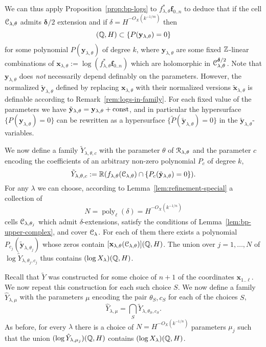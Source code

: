\documentclass[reqno]{amsart}
\renewcommand\~[1]{\widetilde{#1}}
\def\poly{\operatorname{poly}} \def\J{\operatorname{J}}
\def\vf{{\mathbf f}}
\def\vx{{\mathbf x}}
\def\vy{{\mathbf y}}
\def\vdelta{{\boldsymbol\delta}}
\begin{document}
We can thus apply Proposition~\ref{prop:bp-logs} to
$f_{\lambda,\theta}^*\vf_{0..n}$ to deduce that if the cell
${\mathcal C}_{\lambda,\theta}$ admits $\vdelta/2$ extension and if
$\delta = H^{-O_X(k^{-1/m})}$ then
\begin{equation}
  [\vx_{\lambda,\theta}(\cC_{\lambda,\theta})](\Q,H)\subset\{P(\vy_{\lambda,\theta})=0\}
\end{equation}
for some polynomial $P(\vy_{\lambda,\theta})$ of degree $k$, where
$\vy_{\lambda,\theta}$ are some fixed ${\mathbb Z}$-linear combinations of
$\vx_{\lambda,\theta}:=\log (f^*_{\lambda,\theta}\vf_{0..n})$ which
are holomorphic in $\cC_{\lambda,\theta}^{\vdelta/2}$. Note that
$\vy_{\lambda,\theta}$ does \emph{not} necessarily depend definably on
the parameters. However, the normalized $\tilde\vy_{\lambda,\theta}$
defined by replacing $\vx_{\lambda,\theta}$ with their normalized
versions $\tilde\vx_{\lambda,\theta}$ is definable according to
Remark~\ref{rem:logs-in-family}. For each fixed value of the
parameters we have
$\tilde\vy_{\lambda,\theta}=\vy_{\lambda,\theta}+\const$, and in
particular the hypersurface $\{P(\vy_{\lambda,\theta})=0\}$ can be
rewritten as a hypersurface
$\{\tilde P(\tilde\vy_{\lambda,\theta})=0\}$ in the
$\tilde\vy_{\lambda,\theta}$-variables.

We now define a family $\tilde Y_{\lambda,\theta,c}$ with the
parameter $\theta$ of ${\mathcal R}_{\lambda,\theta}$ and the parameter $c$
encoding the coefficients of an arbitrary non-zero polynomial $P_c$ of
degree $k$,
\begin{equation}
  \tilde Y_{\lambda,\theta,c} := \R (f_{\lambda,\theta}(\cC_{\lambda,\theta})\cap \{P_c(\tilde\vy_{\lambda,\theta})=0\}).
\end{equation}
For any $\lambda$ we can choose, according to
Lemma~\ref{lem:refinement-special} a collection of
\begin{equation}
  N=\poly_\ell(\delta)=H^{-O_X(k^{-1/n})}
\end{equation}
cells ${\mathcal C}_{\lambda,\theta_j}$ which admit $\delta$-extensions,
satisfy the conditions of Lemma~\ref{lem:bp-upper-complex}, and cover
${\mathcal C}_\lambda$. For each of them there exists a polynomial
$P_{c_j}(\tilde\vy_{\lambda,\theta_j})$ whose zeros contain
$[\vx_{\lambda,\theta}(\cC_{\lambda,\theta})](\Q,H)$. The union over
$j=1,\ldots,N$ of $\log \tilde Y_{\lambda,\theta_j,c_j}$ thus contains
$(\log X_\lambda)({\mathbb Q},H)$.

Recall that $\tilde Y$ was constructed for some choice of $n+1$ of
the coordinates $\vx_{1..\ell}$. We now repeat this construction for
each such choice $S$. We now define a family $\hat Y_{\lambda,\mu}$
with the parameters $\mu$ encoding the pair $\theta_S,c_S$ for each of
the choices $S$,
\begin{equation}
  \hat Y_{\lambda,\mu} = \bigcap_S \tilde Y_{\lambda,\theta_S,c_S}.
\end{equation}
As before, for every $\lambda$ there is a choice of
$N=H^{-O_X(k^{-1/n})}$ parameters $\mu_j$ such that the union
$(\log \hat Y_{\lambda,\mu_j})({\mathbb Q},H)$ contains $(\log X_\lambda)({\mathbb Q},H)$.
\end{document}
